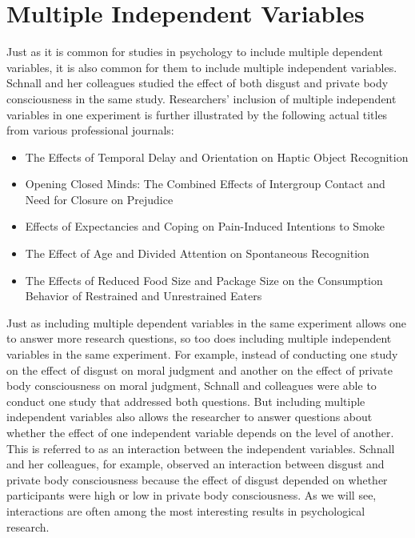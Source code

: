 \section{Multiple Independent Variables}


Just as it is common for studies in psychology to include multiple dependent variables, it is also common for them to include multiple independent variables. Schnall and her colleagues studied the effect of both disgust and private body consciousness in the same study. Researchers' inclusion of multiple independent variables in one experiment is further illustrated by the following actual titles from various professional journals:
\begin{itemize}
\item The Effects of Temporal Delay and Orientation on Haptic Object Recognition
\item Opening Closed Minds: The Combined Effects of Intergroup Contact and Need for Closure on Prejudice
\item Effects of Expectancies and Coping on Pain-Induced Intentions to Smoke
\item The Effect of Age and Divided Attention on Spontaneous Recognition
\item The Effects of Reduced Food Size and Package Size on the Consumption Behavior of Restrained and
Unrestrained Eaters
\end{itemize}

Just as including multiple dependent variables in the same experiment allows one to answer more research questions, so too does including multiple independent variables in the same experiment. For example, instead of conducting one study on the effect of disgust on moral judgment and another on the effect of private body consciousness on moral judgment, Schnall and colleagues were able to conduct one study that addressed both questions. But including multiple independent variables also allows the researcher to answer questions about whether the effect of one independent variable depends on the level of another. This is referred to as an interaction between the independent variables. Schnall and her colleagues, for example, observed an interaction between disgust and private body consciousness because the effect of disgust depended on whether participants were high or low in private body consciousness. As we will see, interactions are often among the most interesting results in psychological research.

